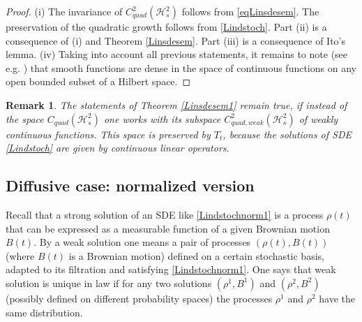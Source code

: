 \documentclass[12pt]{article}
\def\HC{\mathcal{H}}
\def\ga{\gamma}
\newtheorem{remark}{Remark}
\begin{document}
\begin{proof}
(i) The invariance of $C_{quad}^2(\HC^2_s)$ follows from
\eqref{eqLinsdesem}. The preservation of the quadratic growth
 follows from \eqref{Lindstoch}. Part (ii) is a consequence of (i) and Theorem \ref{Linsdesem}.
 Part (iii) is a consequence of Ito's lemma. (iv) Taking into account all previous statements,
it remains to note (see e.g. \cite{Eells}) that smooth functions are dense in the space of continuous functions
on any open bounded subset of a Hilbert space.
\end{proof}

\begin{remark}
The statements of Theorem \ref{Linsdesem1} remain true, if instead of
the space $C_{quad}(\HC^2_s)$ one works with its subspace $C_{quad, weak}^2(\HC^2_s)$ of weakly continuous functions.
This space is preserved by $T_t$, because the solutions of  SDE \eqref{Lindstoch} are given by continuous linear operators.
\end{remark}


\subsection{Diffusive case: normalized version}
\label{secnormeq}

 Recall that a strong
solution of an SDE like \eqref{Lindstochnorm1} is a process $\rho(t)$ that can
 be expressed as a measurable function of a given Brownian motion $B(t)$. By a
weak solution one means a pair of processes $(\rho(t),B(t))$ (where $B(t)$ is a Brownian
motion) defined on a certain stochastic basis, adapted to its filtration and satisfying
\eqref{Lindstochnorm1}. One says that weak solution is  unique in law
if for any two solutions $(\rho^1,B^1)$ and $(\rho^2,B^2)$ (possibly defined on
different probability spaces) the processes $\rho^1$ and $\rho^2$ have the same distribution.
\end{document}
